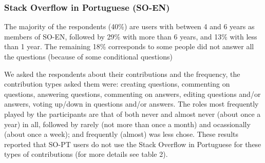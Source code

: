 \subsubsection{Stack Overflow in Portuguese (SO-EN)}
The majority of the respondents (40\%) are users with between 4 and 6 years as members of SO-EN, followed by 29\% with more than 6 years, and 13\% with less than 1 year. The remaining 18\% corresponds to some people did not answer all the questions (because of some conditional questions)

We asked the respondents about their contributions and the frequency, the contribution types asked them were: creating questions, commenting on questions, answering questions, commenting on answers, editing questions and/or answers, voting up/down in questions and/or answers. The roles most frequently played by the participants are that of both never and almost never (about once a year) in all, followed by rarely (not more than once a month) and ocassionally (about once a week); and frequently (almost) was less chose. These results reported that SO-PT users do not use the Stack Overflow in Portuguese for these types of contributions (for more details see table 2). 


